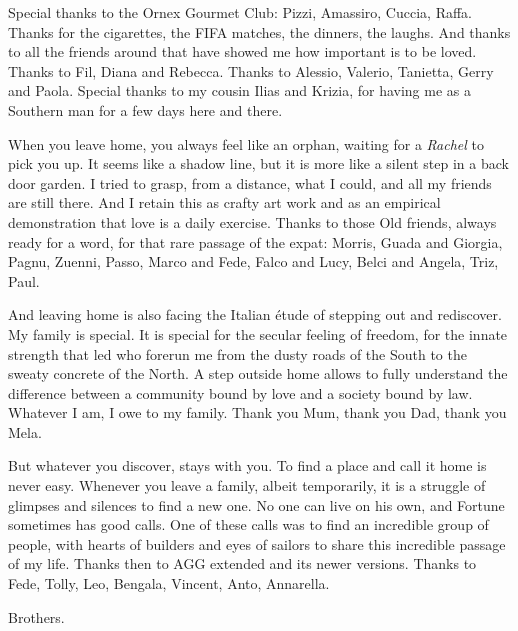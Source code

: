 Special thanks to the Ornex Gourmet Club: Pizzi, Amassiro, Cuccia, Raffa. Thanks for the cigarettes, the FIFA matches, the dinners, the laughs.
And thanks to all the friends around that have showed me how important is to be loved. Thanks to Fil, Diana and Rebecca. Thanks to Alessio, Valerio, Tanietta, Gerry and Paola. Special thanks to my cousin Ilias and Krizia, for having me as a Southern man for a few days here and there.

When you leave home, you always feel like an orphan, waiting for a \textit{Rachel} to pick you up. It seems like a shadow line, but it is more like a silent step in a back door garden. I tried to grasp, from a distance, what I could, and all my friends are still there. And I retain this as crafty art work and as an empirical demonstration that love is a daily exercise. Thanks to those Old friends, always ready for a word, for that rare passage of the expat: Morris, Guada and Giorgia, Pagnu, Zuenni, Passo, Marco and Fede, Falco and Lucy, Belci and Angela, Triz, Paul.

And leaving home is also facing the Italian \'etude of stepping out and rediscover. My family is special. It is special for the secular feeling of freedom, for the innate strength that led who forerun me from the dusty roads of the South to the sweaty concrete of the North. A step outside home allows to fully understand the difference between a community bound by love and a society bound by law. Whatever I am, I owe to my family. Thank you Mum, thank you Dad, thank you Mela.

But whatever you discover, stays with you. To find a place and call it home is never easy. Whenever you leave a family, albeit temporarily, it is a struggle of glimpses and silences to find a new one. No one can live on his own, and Fortune sometimes has good calls. One of these calls was to find an incredible group of people, with hearts of builders and eyes of sailors to share this incredible passage of my life. Thanks then to AGG extended and its newer versions. Thanks to Fede, Tolly, Leo, Bengala, Vincent, Anto, Annarella.

Brothers.


